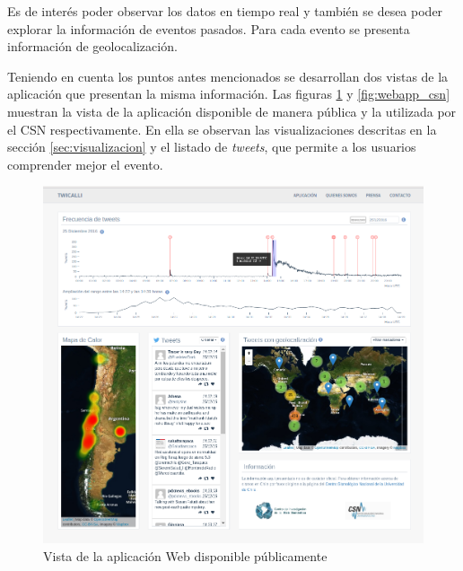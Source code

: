 Es de interés poder observar los datos en tiempo real y también se desea poder explorar la información de eventos pasados. 
%
Para cada evento se presenta información de geolocalización. 


Teniendo en cuenta los puntos antes mencionados se desarrollan dos vistas de la aplicación que presentan la misma información. 
% 
Las figuras \ref{fig:webapp} y \ref{fig:webapp_csn} muestran la vista de la aplicación disponible de manera pública y la utilizada por el CSN respectivamente. 
%
En ella se observan las visualizaciones descritas en la sección \ref{sec:visualizacion} y el listado de \textit{tweets}, que permite a los usuarios comprender mejor el evento. 

	\begin{figure}[ht]
	  \centering
	  \includegraphics[trim={0 0 0 0}, clip, width=\textwidth]{imagenes/aplicacionexplorar.png}
	  \caption{Vista de la aplicación Web disponible públicamente}
	\label{fig:webapp}
	\end{figure}
	
